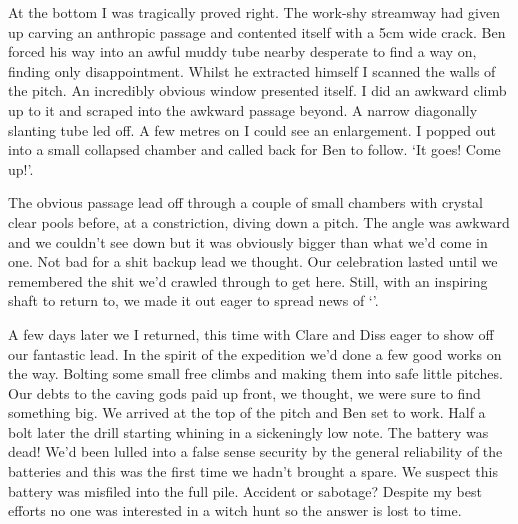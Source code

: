 At the bottom I was tragically proved right. The work-shy streamway had given up carving an anthropic passage and contented itself with a 5cm wide crack. Ben forced his way into an awful muddy tube nearby desperate to find a way on, finding only disappointment. Whilst he extracted himself I scanned the walls of the pitch. An incredibly obvious window presented itself. I did an awkward climb up to it and scraped into the awkward passage beyond. A narrow diagonally slanting tube led off. A few metres on I could see an enlargement. I popped out into a small collapsed chamber and called back for Ben to follow. `It goes! Come up!'. 

The obvious passage lead off through a couple of small chambers with crystal clear pools before, at a constriction, diving down a pitch. The angle was awkward and we couldn't see down but it was obviously bigger than what we'd come in one. Not bad for a shit backup lead we thought. Our celebration lasted until we remembered the shit we'd crawled through to get here. Still, with an inspiring shaft to return to, we made it out eager to spread news of `'.
 \begin{marginfigure}
\end{marginfigure}
A few days later we I returned, this time with Clare and Diss eager to show off our fantastic lead. In the spirit of the expedition we'd done a few good works on the way. Bolting some small free climbs and making them into safe little pitches. Our debts to the caving gods paid up front, we thought, we were sure to find something big. We arrived at the top of the pitch and Ben set to work. Half a bolt later the drill starting whining in a sickeningly low note. The battery was dead! We'd been lulled into a false sense security by the general reliability of the batteries and this was the first time we hadn't brought a spare. We suspect this battery was misfiled into the full pile. Accident or sabotage? Despite my best efforts no one was interested in a witch hunt so the answer is lost to time.

